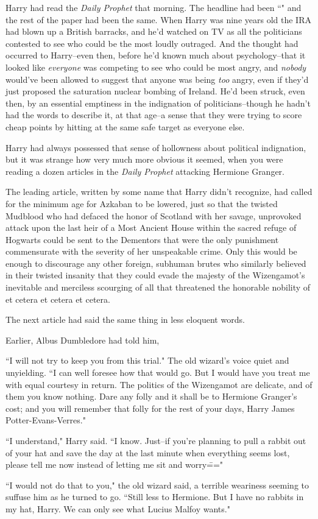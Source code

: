 Harry had read the \emph{Daily Prophet} that morning. The headline had been ``" and the rest of the paper had been the same. When Harry was nine years old the IRA had blown up a British barracks, and he'd watched on TV as all the politicians contested to see who could be the most loudly outraged. And the thought had occurred to Harry\---even then, before he'd known much about psychology\---that it looked like \emph{everyone} was competing to see who could be most angry, and \emph{nobody} would've been allowed to suggest that anyone was being \emph{too} angry, even if they'd just proposed the saturation nuclear bombing of Ireland. He'd been struck, even then, by an essential emptiness in the indignation of politicians\---though he hadn't had the words to describe it, at that age\---a sense that they were trying to score cheap points by hitting at the same safe target as everyone else.

Harry had always possessed that sense of hollowness about political indignation, but it was strange how very much more obvious it seemed, when you were reading a dozen articles in the \emph{Daily Prophet} attacking Hermione Granger.

The leading article, written by some name that Harry didn't recognize, had called for the minimum age for Azkaban to be lowered, just so that the twisted Mudblood who had defaced the honor of Scotland with her savage, unprovoked attack upon the last heir of a Most Ancient House within the sacred refuge of Hogwarts could be sent to the Dementors that were the only punishment commensurate with the severity of her unspeakable crime. Only this would be enough to discourage any other foreign, subhuman brutes who similarly believed in their twisted insanity that they could evade the majesty of the Wizengamot's inevitable and merciless scourging of all that threatened the honorable nobility of et cetera et cetera et cetera.

The next article had said the same thing in less eloquent words.

Earlier, Albus Dumbledore had told him,

\begin{em}
``I will not try to keep you from this trial." The old wizard's voice quiet and unyielding. ``I can well foresee how that would go. But I would have you treat me with equal courtesy in return. The politics of the Wizengamot are delicate, and of them you know nothing. Dare any folly and it shall be to Hermione Granger's cost; and you will remember that folly for the rest of your days, Harry James Potter-Evans-Verres."

``I understand," Harry said. ``I know. Just\---if you're planning to pull a rabbit out of your hat and save the day at the last minute when everything seems lost, please tell me now instead of letting me sit and worry\==="

``I would not do that to you," the old wizard said, a terrible weariness seeming to suffuse him as he turned to go. ``Still less to Hermione. But I have no rabbits in my hat, Harry. We can only see what Lucius Malfoy wants."
\end{em}

